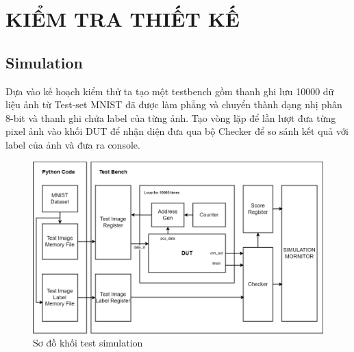 \section{KIỂM TRA THIẾT KẾ}

\subsection{Simulation}
Dựa vào kế hoạch kiểm thử ta tạo một testbench gồm thanh ghi lưu 10000 dữ liệu ảnh từ Test-set MNIST đã được làm phẳng và chuyển thành dạng nhị phân 8-bit và thanh ghi chứa label của từng ảnh. Tạo vòng lặp để lần lượt đưa từng pixel ảnh vào khối DUT để nhận diện đưa qua bộ Checker để so sánh kết quả với label của ảnh và đưa ra console. 
\begin{figure}[H]
    \centering
    \includegraphics[width=1\linewidth]{Images/cnn_dut_mnist_test.drawio.png}
    \caption{Sơ đồ khối test simulation}
    \label{fig:enter-label}
\end{figure}

